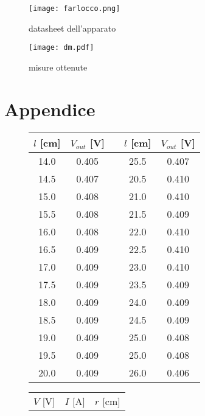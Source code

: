 \begin{figure}[H]
	\centering
		\begin{minipage}{0.5\textwidth}
			\texttt{[image: farlocco.png]}
			\caption{datasheet dell'apparato}
			\label{grafico_farlocco}
		\end{minipage}
		\begin{minipage}{0.49\textwidth}
			\texttt{[image: dm.pdf]}
			\caption{misure ottenute}
			\label{dati_nostri}
		\end{minipage}
\end{figure}

\newpage
\section{Appendice}
\begin{figure}[h!]
\begin{minipage}{0.49\textwidth}
		\centering
		\begin{tabular}{ccccc}
			\toprule
			$l$ [\si{cm}]	& 	$V_{out}$ [\si{\volt}]	&& 	$l$ [\si{cm}]	& 	$V_{out}$ [\si{\volt}] \\
			\midrule
			14.0 	& 	 0.405	&&	25.5	& 	 0.407 \\
			14.5	& 	 0.407	&&	20.5	& 	 0.410 \\
			15.0	& 	 0.408	&&	21.0	& 	 0.410 \\
			15.5	& 	 0.408	&&	21.5	& 	 0.409 \\
			16.0	& 	 0.408	&&	22.0	& 	 0.410 \\
			16.5	& 	 0.409	&&	22.5	& 	 0.410 \\
			17.0	& 	 0.409	&&	23.0	& 	 0.410 \\
			17.5	& 	 0.409	&&	23.5	& 	 0.409 \\
			18.0	& 	 0.409	&&	24.0	& 	 0.409 \\
			18.5	& 	 0.409	&&	24.5	& 	 0.409 \\
			19.0	& 	 0.409	&&	25.0	& 	 0.408 \\
			19.5	& 	 0.409	&&	25.0	& 	 0.408 \\
			20.0	& 	 0.409	&&	26.0	& 	 0.406 \\
			\bottomrule
		\end{tabular}
		\label{tab:a}
\end{minipage}
\begin{minipage}{0.49\textwidth}
	\centering
\begin{tabular}{ccc}
	\toprule
$V$ [\si{\volt}] & 	$I$ [\si{\ampere}] & $r$ [\si{\cm}]\\

\end{tabular}
\end{minipage}
\end{figure}
